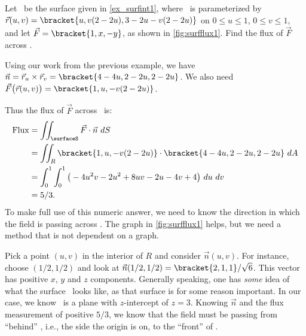 {Let \surfaceS\ be the surface given in \autoref{ex_surfint1}, where \surfaceS\ is parameterized by $\vec r(u,v) =\bracket{u, v(2-2u),3-2u-v(2-2u)}$ on $0\leq u\leq 1$, $0\leq v\leq 1$, and let $\vec F =\bracket{1, x,-y}$, as shown in \autoref{fig:surfflux1}. Find the flux of $\vec F$ across \surfaceS.}
{Using our work from the previous example, we have $\vec n = \vec r_u\times\vec r_v =\bracket{4-4u,2-2u,2-2u}$. We also need $\vec F\big(\vec r(u,v)\big) =\bracket{1, u, -v(2-2u)}$. 

Thus the flux of $\vec F$ across \surfaceS\ is:
\begin{align*}
	\text{Flux}
	&= \iint_\surfaceS \vec F\cdot \vec n\ dS\\
	&= \iint_R\bracket{1,u,-v(2-2u)}\cdot\bracket{4-4u,2-2u,2-2u}\ dA \\
	&= \int_0^1\int_0^1 \big(-4u^2v-2u^2+8uv-2u-4v+4\big)\ du\ dv\\
	&= 5/3.
\end{align*}
To make full use of this numeric answer, we need to know the direction in which the field is passing across \surfaceS. The graph in \autoref{fig:surfflux1} helps, but we need a method that is not dependent on a graph.

Pick a point $(u,v)$ in the interior of $R$ and consider $\vec n(u,v)$. For instance, choose $(1/2,1/2)$ and look at $\vec n(1/2,1/2) =\bracket{2,1,1}/\sqrt{6}$. This vector has positive $x$, $y$ and $z$ components. Generally speaking, one has \emph{some} idea of what the surface \surfaceS\ looks like, as that surface is for some reason important. In our case, we know \surfaceS\ is a plane with $z$-intercept of $z=3$. Knowing $\vec n$ and the flux measurement of positive $5/3$, we know that the field must be passing from ``behind'' \surfaceS, i.e., the side the origin is on, to the ``front'' of \surfaceS.}


